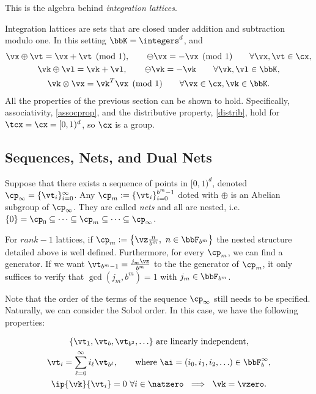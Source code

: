 \documentclass[]{elsarticle}
\theoremstyle{definition}
\newcommand{\cube}{[0,1)^d}
\begin{document}
This is the algebra behind \emph{integration lattices}.

Integration lattices are sets that are closed under addition and subtraction modulo one.  In this setting $\bbK=\integers^d$, and
\begin{gather*}
\vx \oplus \vt = \vx + \vt \pmod 1, \qquad \ominus \vx = -\vx \pmod 1 \qquad \forall \vx, \vt \in \cx, \\
\vk \oplus \vl = \vk + \vl, \qquad \ominus \vk = -\vk \qquad \forall \vk, \vl \in \bbK, \\
\vk \otimes \vx = \vk^T \vx \pmod 1 \qquad \forall \vx \in \cx, \vk \in \bbK.
\end{gather*}
All the properties of the previous section can be shown to hold.  Specifically, associativity, \eqref{assocprop}, and the distributive property, \eqref{distrib}, hold for $\tcx = \cx=[0,1)^d$, so $\cx$ is a group.

\subsection{Sequences, Nets, and Dual Nets}
Suppose that there exists a sequence of points in $\cube$, denoted $\cp_\infty =\{\vt_i\}_{i=0}^{\infty}$. Any $\cp_m := \{\vt_i\}_{i=0}^{b^m-1}$ doted with $\oplus$ is an Abelian subgroup of $\cp_\infty$. They are called \emph{nets} and all are nested, i.e. $\{0\}=\cp_0\subseteq\dots\subseteq\cp_m\subseteq\dots\subseteq\cp_\infty$.

For $rank-1$ lattices, if $\cp_m :=\left\{\vz\frac{n}{b^m},\ n\in\bbF_{b^m}\right\}$ the nested structure detailed above is well defined. Furthermore, for every $\cp_m$, we can find a generator. If we want $\vt_{b^m-1}=\frac{j_m\vz}{b^m}$ to the the generator of $\cp_m$, it only suffices to verify that $\gcd(j_m,b^m)=1$ with $j_m\in\bbF_{b^m}$.

Note that the order of the terms of the sequence $\cp_\infty$ still needs to be specified. Naturally, we can consider the Sobol order. In this case, we have the following properties:

\begin{subequations} \label{cpinfvector}
\begin{gather}
\{\vt_1, \vt_b, \vt_{b^2}, \ldots\} \text{ are linearly independent}, \\
\vt_i = \sum_{\ell=0}^{\infty} i_\ell \vt_{b^\ell}, \qquad \text{where }\ai=(i_0, i_1, i_2, \ldots ) \in \bbF_b^\infty, \\
\ip{\vk}{\vt_i} =  0 \ \forall i \in \natzero   \ \implies \ \vk=\vzero. \label{netpropc}
\end{gather}
\end{subequations}
\end{document}

